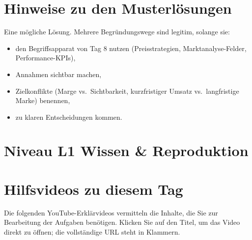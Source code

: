 \documentclass[11pt,a4paper,oneside]{article}
\begin{document}
\section*{Hinweise zu den Musterlösungen}
\thispagestyle{plain}

\noindent Eine mögliche Lösung. Mehrere Begründungswege sind legitim, solange sie:

\begin{itemize}
  \item den Begriffsapparat von Tag 8 nutzen (Preisstrategien, Marktanalyse-Felder, Performance-KPIs),
  \item Annahmen sichtbar machen,
  \item Zielkonflikte (Marge vs.\ Sichtbarkeit, kurzfristiger Umsatz vs.\ langfristige Marke) benennen,
  \item zu klaren Entscheidungen kommen.
\end{itemize}

\clearpage

\section*{Niveau L1 \textendash{} Wissen \& Reproduktion}

\section*{Hilfsvideos zu diesem Tag}
\thispagestyle{plain}

\noindent Die folgenden YouTube-Erkl\"arvideos vermitteln die Inhalte, die Sie zur Bearbeitung der Aufgaben ben\"otigen. Klicken Sie auf den Titel, um das Video direkt zu \"offnen; die vollst\"andige URL steht in Klammern.
\end{document}
